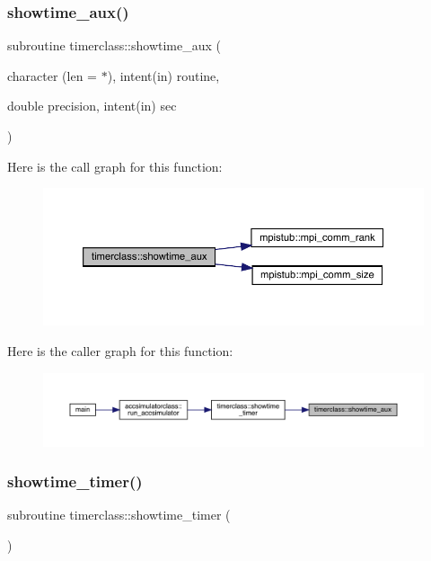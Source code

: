 \subsubsection{\texorpdfstring{showtime\_aux()}{showtime\_aux()}}
{\footnotesize\ttfamily subroutine timerclass\+::showtime\+\_\+aux (\begin{DoxyParamCaption}\item[{character (len = $\ast$), intent(in)}]{routine,  }\item[{double precision, intent(in)}]{sec }\end{DoxyParamCaption})}

Here is the call graph for this function\+:\nopagebreak
\begin{figure}[H]
\begin{center}
\leavevmode
\includegraphics[width=350pt]{namespacetimerclass_a3535b11970327778ddd27cee93c2288b_cgraph}
\end{center}
\end{figure}
Here is the caller graph for this function\+:\nopagebreak
\begin{figure}[H]
\begin{center}
\leavevmode
\includegraphics[width=350pt]{namespacetimerclass_a3535b11970327778ddd27cee93c2288b_icgraph}
\end{center}
\end{figure}
\mbox{\label{namespacetimerclass_aa34d67fa57ad546ab7e1a7fb1643e9b0}} 
\subsubsection{\texorpdfstring{showtime\_timer()}{showtime\_timer()}}
{\footnotesize\ttfamily subroutine timerclass\+::showtime\+\_\+timer (\begin{DoxyParamCaption}{ }\end{DoxyParamCaption})}

